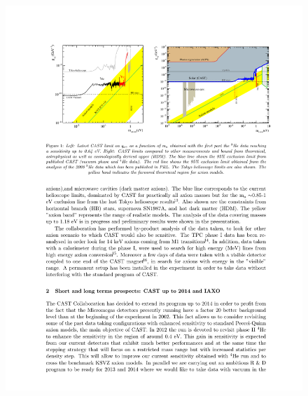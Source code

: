 \begin{figure}
\centering
\begin{minipage}{.5\textwidth}
  \centering
  \includegraphics[width=\linewidth]{figures/cast/axion_search_cast.pdf}
  \label{fig:wolter1-diagram}
\end{minipage}%
\begin{minipage}{.5\textwidth}

\end{minipage}
\end{figure}
